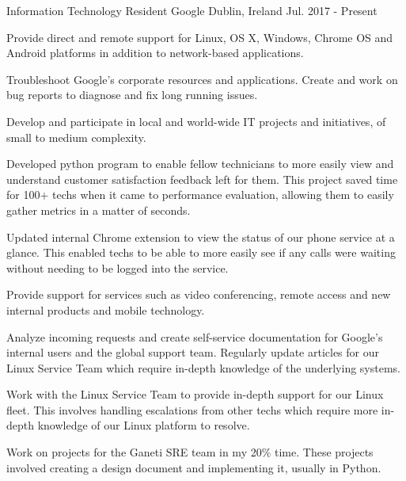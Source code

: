 

\begin{cventries}

  \cventry
    {Information Technology Resident} %
    {Google} %
    {Dublin, Ireland} %
    {Jul. 2017 - Present} %
    {
      \begin{cvitems} %
        \item {Provide direct and remote support for Linux, OS X, Windows, Chrome OS and Android platforms in addition to network-based applications.}
	\item {Troubleshoot Google's corporate resources and applications. Create and work on bug reports to diagnose and fix long running issues.}
        \item {Develop and participate in local and world-wide IT projects and initiatives, of small to medium complexity.}
        \item {Developed python program to enable fellow technicians to more easily view and understand customer satisfaction feedback left for them. This project saved time for 100+ techs when it came to performance evaluation, allowing them to easily gather metrics in a matter of seconds.}
        \item {Updated internal Chrome extension to view the status of our phone service at a glance. This enabled techs to be able to more easily see if any calls were waiting without needing to be logged into the service.}
        \item {Provide support for services such as video conferencing, remote access and new internal products and mobile technology.}
        \item {Analyze incoming requests and create self-service documentation for Google’s internal users and the global support team. Regularly update articles for our Linux Service Team which require in-depth knowledge of the underlying systems.}
	\item {Work with the Linux Service Team to provide in-depth support for our Linux fleet. This involves handling escalations from other techs which require more in-depth knowledge of our Linux platform to resolve.}
        \item {Work on projects for the Ganeti SRE team in my 20\% time. These projects involved creating a design document and implementing it, usually in Python.}
      \end{cvitems}
    }
 

\end{cventries}
